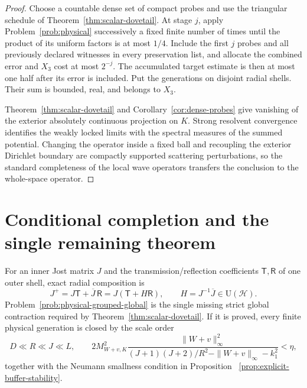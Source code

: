 \documentclass[11pt]{article}
\theoremstyle{remark}
\newcommand{\U}{\mathrm U}
\begin{document}
\begin{proof}
Choose a countable dense set of compact probes and use the triangular schedule
of Theorem~\ref{thm:scalar-dovetail}.  At stage $j$, apply
Problem~\ref{prob:physical} successively a fixed finite number of times until
the product of its uniform factors is at most $1/4$.  Include the first $j$
probes and all previously declared witnesses in every preservation list, and
allocate the combined error and $X_3$ cost at most $2^{-j}$.  The accumulated
target estimate is then at most one half after its error is included.  Put the
generations on disjoint radial shells.  Their sum is bounded, real, and belongs
to $X_3$.

Theorem~\ref{thm:scalar-dovetail} and
Corollary~\ref{cor:dense-probes} give vanishing of the exterior absolutely
continuous projection on $K$.  Strong resolvent convergence identifies the
weakly locked limits with the spectral measures of the summed potential.
Changing the operator inside a fixed ball and recoupling the exterior
Dirichlet boundary are compactly supported scattering perturbations, so the
standard completeness of the local wave operators transfers the conclusion
to the whole-space operator.
\end{proof}

\fi

\section{Conditional completion and the single remaining theorem}

For an inner Jost matrix $J$ and the transmission/reflection coefficients
$\mathsf T,\mathsf R$ of one outer shell, exact radial composition is
\begin{equation}
 J^+=J\mathsf T+\overline J\,\mathsf R
 =J(\mathsf T+H\mathsf R),
 \qquad H=J^{-1}\overline J\in\U(\mathcal H).
 \label{eq:exact-jost-shell-update-final}
\end{equation}
Problem~\ref{prob:physical-grouped-global} is the single missing strict global
contraction required by Theorem~\ref{thm:scalar-dovetail}.  If it is proved,
every finite physical generation is closed by the scale order
\begin{equation}
 D\ll R\ll J\ll L,
 \qquad
 2M_{W+v,K}^2\frac{\|W+v\|_\infty^2}
 {(J+1)(J+2)/R^2-\|W+v\|_\infty-k_1^2}<\eta,
 \label{eq:physical-buffer-target}
\end{equation}
together with the Neumann smallness condition in Proposition
~\ref{prop:explicit-buffer-stability}.
\end{document}

